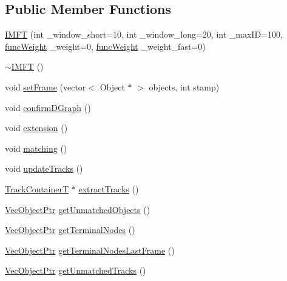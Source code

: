 \subsection*{\-Public \-Member \-Functions}
\begin{DoxyCompactItemize}
\item 
\hyperlink{class_i_m_f_t_adfcb341712779443d1f22168b807f90c}{\-I\-M\-F\-T} (int \-\_\-window\-\_\-short=10, int \-\_\-window\-\_\-long=20, int \-\_\-max\-I\-D=100, \hyperlink{class_i_m_f_t_ae7436174afe28b7a25237c97b2b9f416}{func\-Weight} \-\_\-weight=0, \hyperlink{class_i_m_f_t_ae7436174afe28b7a25237c97b2b9f416}{func\-Weight} \-\_\-weight\-\_\-fast=0)
\item 
\hyperlink{class_i_m_f_t_ac669bb45bbc9b72c4dea37097c66d661}{$\sim$\-I\-M\-F\-T} ()
\item 
void \hyperlink{class_i_m_f_t_ad47b95cc538fd0b52e8f0cf276dda86c}{set\-Frame} (vector$<$ \-Object $\ast$ $>$ objects, int stamp)
\item 
void \hyperlink{class_i_m_f_t_acb040ebe38d14012375f000a9f4df0b9}{confirm\-D\-Graph} ()
\item 
void \hyperlink{class_i_m_f_t_a8a0e5ca756776227e239a67e186938f7}{extension} ()
\item 
void \hyperlink{class_i_m_f_t_a1c4e1853b1dcaf86e50a1ced421af6ad}{matching} ()
\item 
void \hyperlink{class_i_m_f_t_a7b9ee3a95b6586bb08152d872289e042}{update\-Tracks} ()
\item 
\hyperlink{class_i_m_f_t_a8aad0b1bd309bfb92abb74ce45e549a9}{\-Track\-Container\-T} $\ast$ \hyperlink{class_i_m_f_t_a0dcd3c2c2747177fc4ea4f1bb73bae7b}{extract\-Tracks} ()
\item 
\hyperlink{class_i_m_f_t_a03dc658b57ff8debb2b6869be37c0d67}{\-Vec\-Object\-Ptr} \hyperlink{class_i_m_f_t_ad9803bbc0eef9c8680377052793c029c}{get\-Unmatched\-Objects} ()
\item 
\hyperlink{class_i_m_f_t_a03dc658b57ff8debb2b6869be37c0d67}{\-Vec\-Object\-Ptr} \hyperlink{class_i_m_f_t_afe0b6e7d641820f7c8d3bd8b2ed42ec7}{get\-Terminal\-Nodes} ()
\item 
\hyperlink{class_i_m_f_t_a03dc658b57ff8debb2b6869be37c0d67}{\-Vec\-Object\-Ptr} \hyperlink{class_i_m_f_t_a51b02ea25f4830c396608e41ad2dda4d}{get\-Terminal\-Nodes\-Last\-Frame} ()
\item 
\hyperlink{class_i_m_f_t_a03dc658b57ff8debb2b6869be37c0d67}{\-Vec\-Object\-Ptr} \hyperlink{class_i_m_f_t_a981a25796eaf59f23c8819001ab9ee9e}{get\-Unmatched\-Tracks} ()
\item 

\end{DoxyCompactItemize}
